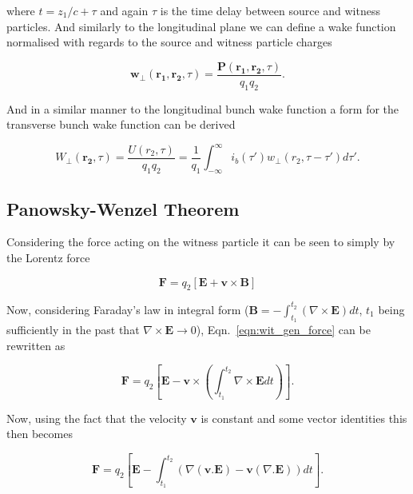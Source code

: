 where $t = z_{1}/c + \tau$ and again $\tau$ is the time delay between source and witness particles. And similarly to the longitudinal plane we can define a wake function normalised with regards to the source and witness particle charges

\begin{equation}
\mathbf{w_{\perp}}\left(\mathbf{r_{1}}, \mathbf{r_{2}}, \tau  \right) = \frac{\mathbf{P}\left(\mathbf{r_{1}}, \mathbf{r_{2}}, \tau  \right)}{q_{1} q_{2}}.
\label{eqn:trans_wake_func}
\end{equation}

And in a similar manner to the longitudinal bunch wake function a form for the transverse bunch wake function can be derived

\begin{equation}
W_{\perp}\left( \mathbf{r_{2}}, \tau \right) = \frac{U\left( r_{2}, \tau \right) }{q_{1} q_{2}} = \frac{1}{q_{1}}\int^{\infty}_{-\infty}i_{b}\left( \tau{}' \right) w_{\perp}\left( r_{2}, \tau{}-\tau{}'\right) d\tau{}' .
\end{equation}

\subsection{Panowsky-Wenzel Theorem}

Considering the force acting on the witness particle it can be seen to simply by the Lorentz force

\begin{equation}
\mathbf{F} = q_{2} \left[\mathbf{E} + \mathbf{v}\times \mathbf{B} \right]
\label{eqn:wit_gen_force}
\end{equation}

Now, considering Faraday's law in integral form ($\mathbf{B} = -\int^{t_{2}}_{t_{1}} \left( \nabla \times \mathbf{E} \right) dt$, $t_{1}$ being sufficiently in the past that $\nabla \times \mathbf{E} \rightarrow 0$), Eqn.~\ref{eqn:wit_gen_force} can be rewritten as

\begin{equation}
\mathbf{F} = q_{2}  \left[\mathbf{E} - \mathbf{v}\times\left(  \int^{t_{2}}_{t_{1}} \nabla \times \mathbf{E} dt \right) \right].
\end{equation}

Now, using the fact that the velocity $\mathbf{v}$ is constant and some vector identities this then becomes

\begin{equation}
\mathbf{F} = q_{2}  \left[\mathbf{E} - \int^{t_{2}}_{t_{1}}\left(  \nabla \left( \mathbf{v} . \mathbf{E} \right)  - \mathbf{v}\left( \nabla . \mathbf{E} \right) \right) dt  \right].
\end{equation}

